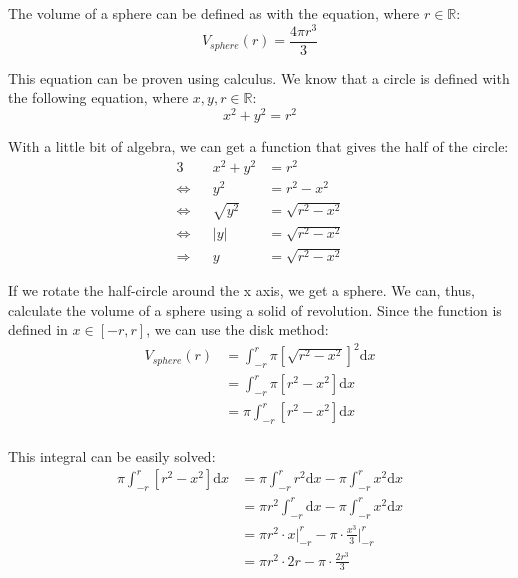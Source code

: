 \documentclass[11pt]{article}
\begin{document}

The volume of a sphere can be defined as with the equation, where $r\in \mathbb{R}$:
\begin{equation}
V_{sphere}(r)=\frac{4\pi r^{3}}{3}
\end{equation}

This equation can be proven using calculus. We know that a circle is defined with the following equation, where $x,y,r\in \mathbb{R}$:
\begin{equation}
x^{2}+y^{2}=r^{2}
\end{equation}

With a little bit of algebra, we can get a function that gives the half of the circle:
\begin{alignat*}{3}
                & &      x^{2}+y^{2} &=      r^{2}       \\
\Leftrightarrow & &            y^{2} &=      r^{2}-x^{2} \\
\Leftrightarrow & &      \sqrt{y^{2}}&=\sqrt{r^{2}-x^{2}}\\
\Leftrightarrow & &  \left |y\right |&=\sqrt{r^{2}-x^{2}}\\
\Rightarrow     & &         y        &=\sqrt{r^{2}-x^{2}}
\end{alignat*}

If we rotate the half-circle around the x axis, we get a sphere. We can, thus, calculate the volume of a sphere using a solid of revolution. Since the function is defined in $x\in\left [-r, r\right ]$, we can use the disk method:
\begin{equation}
\begin{split}
V_{sphere}(r)&=   \int_{-r}^{r}\pi\left [\sqrt{r^{2}-x^{2}}\right ]^{2}\mathrm dx\\
             &=   \int_{-r}^{r}\pi\left [      r^{2}-x^{2} \right ]    \mathrm dx\\
             &=\pi\int_{-r}^{r}   \left [      r^{2}-x^{2} \right ]    \mathrm dx\\
\end{split}
\end{equation}

This integral can be easily solved:
\begin{equation}
\begin{split}
\pi\int_{-r}^{r}\left [r^{2}-x^{2}\right ]\mathrm dx
&=\pi      \int_{-r}^{r}r^{2}\mathrm dx-\pi\int_{-r}^{r}x^{2}\mathrm dx\\
&=\pi r^{2}\int_{-r}^{r}     \mathrm dx-\pi\int_{-r}^{r}x^{2}\mathrm dx\\
&=\pi r^{2}\cdot x\biggr\rvert_{-r}^{r}-\pi\cdot \frac{x^{3}}{3}\biggr\rvert_{-r}^{r}\\
&=\pi r^{2}\cdot 2r-\pi\cdot \frac{2r^{3}}{3}
\end{split}
\end{equation}
\end{document}
